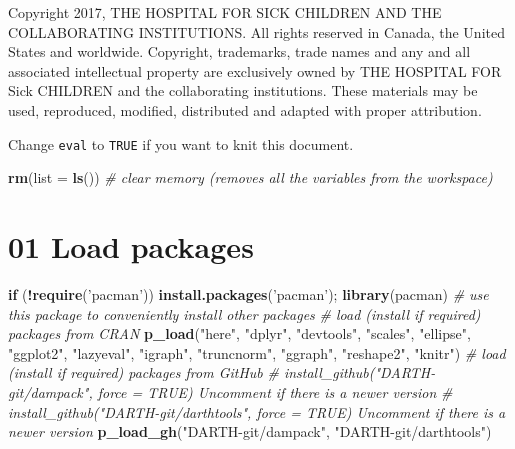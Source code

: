 \documentclass[
]{article}
\newenvironment{Shaded}{\begin{snugshade}}{\end{snugshade}}
\newcommand{\CommentTok}[1]{\textcolor[rgb]{0.56,0.35,0.01}{\textit{#1}}}
\newcommand{\ControlFlowTok}[1]{\textcolor[rgb]{0.13,0.29,0.53}{\textbf{#1}}}
\newcommand{\DataTypeTok}[1]{\textcolor[rgb]{0.13,0.29,0.53}{#1}}
\newcommand{\KeywordTok}[1]{\textcolor[rgb]{0.13,0.29,0.53}{\textbf{#1}}}
\newcommand{\NormalTok}[1]{#1}
\newcommand{\OperatorTok}[1]{\textcolor[rgb]{0.81,0.36,0.00}{\textbf{#1}}}
\newcommand{\StringTok}[1]{\textcolor[rgb]{0.31,0.60,0.02}{#1}}
\begin{document}
Copyright 2017, THE HOSPITAL FOR SICK CHILDREN AND THE COLLABORATING
INSTITUTIONS. All rights reserved in Canada, the United States and
worldwide. Copyright, trademarks, trade names and any and all associated
intellectual property are exclusively owned by THE HOSPITAL FOR Sick
CHILDREN and the collaborating institutions. These materials may be
used, reproduced, modified, distributed and adapted with proper
attribution.

\newpage

Change \texttt{eval} to \texttt{TRUE} if you want to knit this document.

\begin{Shaded}
\begin{Highlighting}[]
\KeywordTok{rm}\NormalTok{(}\DataTypeTok{list =} \KeywordTok{ls}\NormalTok{())      }\CommentTok{# clear memory (removes all the variables from the workspace)}
\end{Highlighting}
\end{Shaded}

\hypertarget{load-packages}{%
\section{01 Load packages}\label{load-packages}}

\begin{Shaded}
\begin{Highlighting}[]
\ControlFlowTok{if}\NormalTok{ (}\OperatorTok{!}\KeywordTok{require}\NormalTok{(}\StringTok{'pacman'}\NormalTok{)) }\KeywordTok{install.packages}\NormalTok{(}\StringTok{'pacman'}\NormalTok{); }\KeywordTok{library}\NormalTok{(pacman) }\CommentTok{# use this package to conveniently install other packages}
\CommentTok{# load (install if required) packages from CRAN}
\KeywordTok{p_load}\NormalTok{(}\StringTok{"here"}\NormalTok{, }\StringTok{"dplyr"}\NormalTok{, }\StringTok{"devtools"}\NormalTok{, }\StringTok{"scales"}\NormalTok{, }\StringTok{"ellipse"}\NormalTok{, }\StringTok{"ggplot2"}\NormalTok{, }\StringTok{"lazyeval"}\NormalTok{, }\StringTok{"igraph"}\NormalTok{, }\StringTok{"truncnorm"}\NormalTok{, }\StringTok{"ggraph"}\NormalTok{, }\StringTok{"reshape2"}\NormalTok{, }\StringTok{"knitr"}\NormalTok{)                                               }
\CommentTok{# load (install if required) packages from GitHub}
\CommentTok{# install_github("DARTH-git/dampack", force = TRUE) Uncomment if there is a newer version}
\CommentTok{# install_github("DARTH-git/darthtools", force = TRUE) Uncomment if there is a newer version}
\KeywordTok{p_load_gh}\NormalTok{(}\StringTok{"DARTH-git/dampack"}\NormalTok{, }\StringTok{"DARTH-git/darthtools"}\NormalTok{)}
\end{Highlighting}
\end{Shaded}
\end{document}
